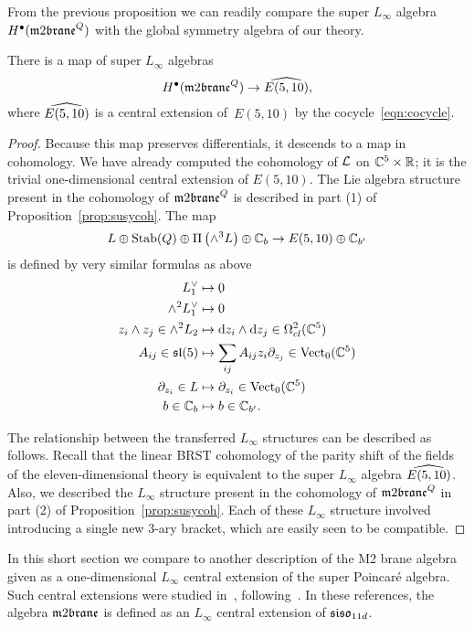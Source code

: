 \parsec[] From the previous proposition we can readily compare the super $L_\infty$ algebra $H^\bu(\m2^Q)$ with the global symmetry algebra of our theory.
\begin{cor}
There is a map of super $L_\infty$ algebras 
\[
H^\bu(\m2^Q)\to \Hat{E(5,10)},
\]
where $\Hat{E(5,10)}$ is a central extension of~$E(5,10)$ by the cocycle~\eqref{eqn:cocycle}.
\end{cor}
\begin{proof}
Because this map preserves differentials, it descends to a map in cohomology. 
We have already computed the cohomology of $\cL$ on $\CC^5 \times \RR$; it is the trivial one-dimensional central extension of $E (5,10)$. 
The Lie algebra structure present in the cohomology of $\m2^Q$ is described in part (1) of Proposition~\ref{prop:susycoh}. 
The map
\[
L \oplus {\rm Stab}(Q) \oplus \Pi \left(\wedge^3 L \right) \oplus \CC_b \to E (5,10) \oplus \CC_{b'}
\]
is defined by very similar formulas as above
\begin{align*}
 L^\vee_1 & \mapsto 0 \\
 \wedge^2 L^\vee_1 & \mapsto 0 \\
z_i \wedge z_j \in \wedge^2 L_2 & \mapsto \d z_i \wedge \d z_j \in \Omega^{2}_{cl} (\CC^5) \\
A_{ij} \in \lie{sl}(5) & \mapsto \sum_{ij} A_{ij} z_i \partial_{z_j} \in \Vect_0(\CC^5) \\ \partial_{z_i} \in L & \mapsto
\partial_{z_i} \in \Vect_0(\CC^5) \\
b \in \CC_b & \mapsto b \in \CC_{b'} .
\end{align*}

The relationship between the transferred $L_\infty$ structures can be described as follows. 
Recall that the linear BRST cohomology of the parity shift of the fields of the eleven-dimensional theory is equivalent to the super $L_\infty$ 
algebra $\Hat{E(5,10)}$.
Also, we described the $L_\infty$ structure present in the cohomology of $\m2^Q$ in part (2) of Proposition~\ref{prop:susycoh}. 
Each of these $L_\infty$ structure involved introducing a single new $3$-ary bracket, which are easily seen to be compatible. 
\end{proof}
\parsec[]

In this short section we compare to another description of the M2 brane algebra given as a one-dimensional $L_\infty$ central extension of the super Poincar\'e algebra.
Such central extensions were studied in~\cite{BHsusyII, SSS, FSS}, following~\cite{CDF}. 
In these references, the algebra $\m2$ is defined as an $L_\infty$  
central extension of $\lie{siso}_{11d}$. 

